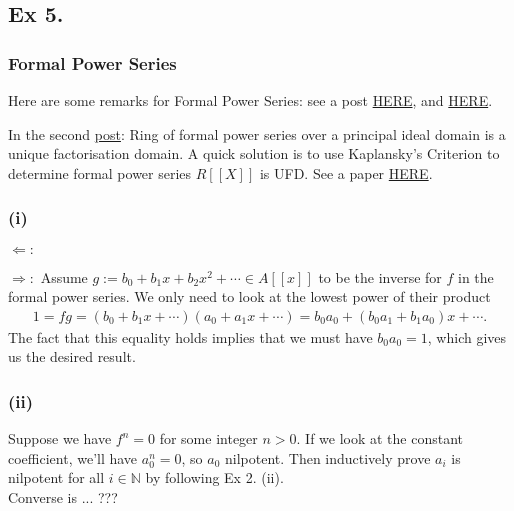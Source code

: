 \subsection{Ex 5.}

\subsubsection{Formal Power Series}

Here are some remarks for Formal Power Series: see a post \href{https://math.stackexchange.com/questions/1096521/ring-of-formal-power-series-over-a-principal-ideal-domain-is-a-unique-factorisat}{HERE}, and \href{https://math.stackexchange.com/questions/457447/if-r-is-an-integral-domain-then-rx-is-an-integral-domain}{HERE}.

In the second \href{https://math.stackexchange.com/questions/1096521/ring-of-formal-power-series-over-a-principal-ideal-domain-is-a-unique-factorisat}{post}: Ring of formal power series over a principal ideal domain is a unique factorisation domain. A quick solution is to use Kaplansky's Criterion to determine formal power series $R[[X]]$ is UFD. See a paper \href{https://people.brandeis.edu/~buchsbau/miscpapers/10052.pdf}{HERE}.

\subsubsection{(i)} 

$\Leftarrow:$ 

\noindent $\Rightarrow:$ Assume $g:=b_0+b_1x+b_2x^2+\cdots\in A[[x]]$ to be the inverse for $f$ in the formal power series.
We only need to look at the lowest power of their product
\begin{align*}
    1=fg=(b_0+b_1x+\cdots)(a_0+a_1x+\cdots)=b_0a_0+(b_0a_1+b_1a_0)x+\cdots.
\end{align*}The fact that this equality holds implies that we must have $b_0a_0=1$, which gives us the desired result.

\subsubsection{(ii)} Suppose we have $f^n=0$ for some integer $n>0$. If we look at the constant coefficient, we'll have $a_0^n=0$, so $a_0$ nilpotent. Then inductively prove $a_i$ is nilpotent for all $i\in \mathbb N$ by following Ex 2. (ii).\\

Converse is ... ???

